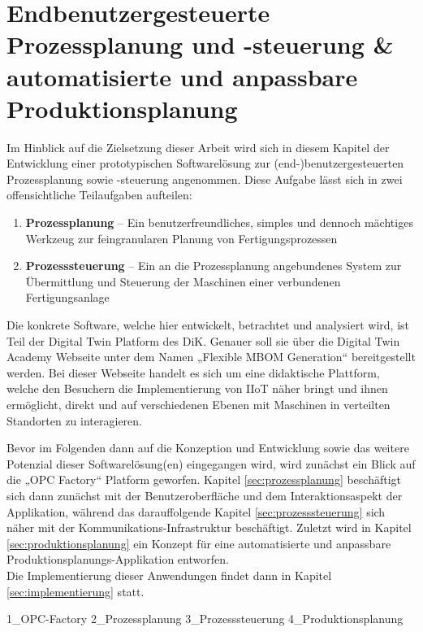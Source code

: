 \chapter{Endbenutzergesteuerte Prozessplanung und -steuerung \& automatisierte und anpassbare Produktionsplanung}
\label{cha:prozessplanungUndProzesssteuerung}

Im Hinblick auf die Zielsetzung dieser Arbeit wird sich in diesem Kapitel der Entwicklung einer prototypischen Softwarelösung zur (end-)benutzergesteuerten Prozessplanung sowie -steuerung angenommen. Diese Aufgabe lässt sich in zwei offensichtliche Teilaufgaben aufteilen:

\begin{enumerate}
    \item \textbf{Prozessplanung} – Ein benutzerfreundliches, simples und dennoch mächtiges Werkzeug zur feingranularen Planung von Fertigungsprozessen
    \item \textbf{Prozesssteuerung} – Ein an die Prozessplanung angebundenes System zur Übermittlung und Steuerung der Maschinen einer verbundenen Fertigungsanlage
\end{enumerate}

Die konkrete Software, welche hier entwickelt, betrachtet und analysiert wird, ist Teil der Digital Twin Platform des DiK. Genauer soll sie über die Digital Twin Academy Webseite unter dem Namen „Flexible MBOM Generation“ bereitgestellt werden. Bei dieser Webseite handelt es sich um eine didaktische Plattform, welche den Besuchern die Implementierung von IIoT näher bringt und ihnen ermöglicht, direkt und auf verschiedenen Ebenen mit Maschinen in verteilten Standorten zu interagieren.

Bevor im Folgenden dann auf die Konzeption und Entwicklung sowie das weitere Potenzial dieser Softwarelösung(en) eingegangen wird, wird zunächst ein Blick auf die „OPC Factory“ Platform geworfen. Kapitel \ref{sec:prozessplanung} beschäftigt sich dann zunächst mit der Benutzeroberfläche und dem Interaktionsaspekt der Applikation, während das darauffolgende Kapitel \ref{sec:prozesssteuerung} sich näher mit der Kommunikations-Infrastruktur beschäftigt. Zuletzt wird in Kapitel \ref{sec:produktionsplanung} ein Konzept für eine automatisierte und anpassbare Produktionsplanungs-Applikation entworfen.\\
Die Implementierung dieser Anwendungen findet dann in Kapitel \ref{sec:implementierung} statt.

{1_OPC-Factory}
{2_Prozessplanung}
{3_Prozesssteuerung}
{4_Produktionsplanung}

